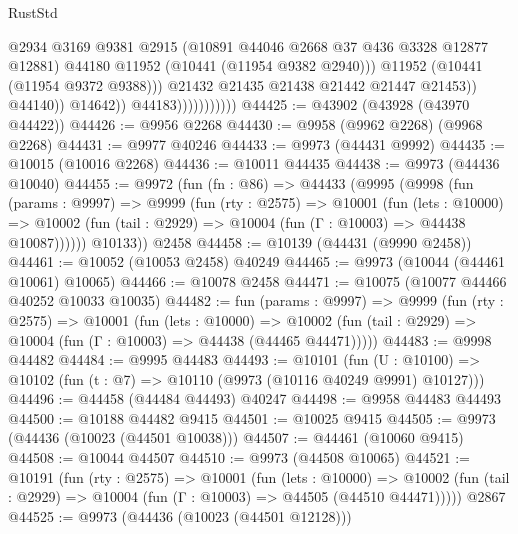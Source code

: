 \begin{lexlean}{RustStd}
\begin{coremodule}
                                          @2934
                                          @3169
                                          @9381
                                          @2915
                                          (@10891 @44046 @2668 @37 @436 @3328 @12877 @12881)
                                          @44180
                                          @11952
                                          (@10441 (@11954 @9382 @2940)))
                                        @11952
                                        (@10441 (@11954 @9372 @9388)))
                                      @21432
                                      @21435
                                      @21438
                                      @21442
                                      @21447
                                      @21453))
                                  @44140))
                              @14642))
                          @44183)))))))))))
@44425 := @43902 (@43928 (@43970 @44422))
@44426 := @9956 @2268
@44430 := @9958 (@9962 @2268) (@9968 @2268)
@44431 := @9977 @40246
@44433 := @9973 (@44431 @9992)
@44435 := @10015 (@10016 @2268)
@44436 := @10011 @44435
@44438 := @9973 (@44436 @10040)
@44455 := @9972
    (fun (fn : @86) =>
    @44433
      (@9995
        (@9998
          (fun (params : @9997) =>
          @9999
            (fun (rty : @2575) =>
            @10001
              (fun (lets : @10000) =>
              @10002 (fun (tail : @2929) => @10004 (fun (Γ : @10003) => @44438 @10087))))))
        @10133))
    @2458
@44458 := @10139 (@44431 (@9990 @2458))
@44461 := @10052 (@10053 @2458) @40249
@44465 := @9973 (@10044 (@44461 @10061) @10065)
@44466 := @10078 @2458
@44471 := @10075 (@10077 @44466 @40252 @10033 @10035)
@44482 := fun (params : @9997) =>
  @9999
    (fun (rty : @2575) =>
    @10001
      (fun (lets : @10000) =>
      @10002 (fun (tail : @2929) => @10004 (fun (Γ : @10003) => @44438 (@44465 @44471)))))
@44483 := @9998 @44482
@44484 := @9995 @44483
@44493 := @10101
    (fun (U : @10100) => @10102 (fun (t : @7) => @10110 (@9973 (@10116 @40249 @9991) @10127)))
@44496 := @44458 (@44484 @44493) @40247
@44498 := @9958 @44483 @44493
@44500 := @10188 @44482 @9415
@44501 := @10025 @9415
@44505 := @9973 (@44436 (@10023 (@44501 @10038)))
@44507 := @44461 (@10060 @9415)
@44508 := @10044 @44507
@44510 := @9973 (@44508 @10065)
@44521 := @10191
    (fun (rty : @2575) =>
    @10001
      (fun (lets : @10000) =>
      @10002 (fun (tail : @2929) => @10004 (fun (Γ : @10003) => @44505 (@44510 @44471)))))
    @2867
@44525 := @9973 (@44436 (@10023 (@44501 @12128)))

\end{coremodule}
\end{lexlean}
